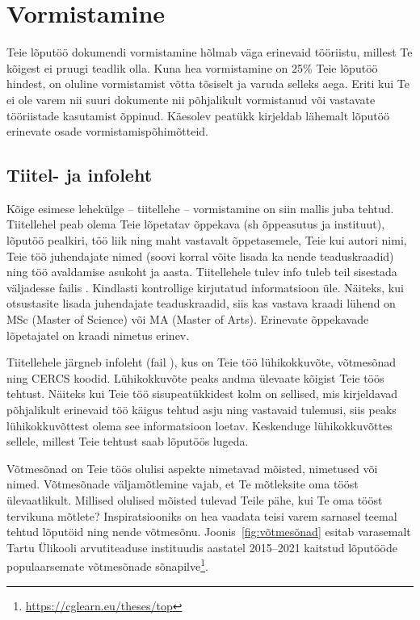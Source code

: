 \section{Vormistamine}\label{vormistamine}
Teie lõputöö dokumendi vormistamine hõlmab väga erinevaid tööriistu, millest Te kõigest ei pruugi teadlik olla. Kuna hea vormistamine on 25\% Teie lõputöö hindest, on oluline vormistamist võtta tõsiselt ja varuda selleks aega. Eriti kui Te ei ole varem nii suuri dokumente nii põhjalikult vormistanud või vastavate tööriistade kasutamist õppinud. Käesolev peatükk kirjeldab lähemalt lõputöö erinevate osade vormistamispõhimõtteid.

\subsection{Tiitel- ja infoleht}
Kõige esimese lehekülge – tiitellehe – vormistamine on siin mallis juba tehtud. Tiitellehel peab olema Teie lõpetatav õppekava (sh õppeasutus ja instituut), lõputöö pealkiri, töö liik ning maht vastavalt õppetasemele, Teie kui autori nimi, Teie töö juhendajate nimed (soovi korral võite lisada ka nende teaduskraadid) ning töö avaldamise asukoht ja aasta. Tiitellehele tulev info tuleb teil sisestada väljadesse failis . Kindlasti kontrollige kirjutatud informatsioon üle. Näiteks, kui otsustasite lisada juhendajate teaduskraadid, siis kas vastava kraadi lühend on MSc (Master of Science) või MA (Master of Arts). Erinevate õppekavade lõpetajatel on kraadi nimetus erinev.

Tiitellehele järgneb infoleht (fail ), kus on Teie töö lühikokkuvõte, võtmesõnad ning CERCS koodid. Lühikokkuvõte peaks andma ülevaate kõigist Teie töös tehtust. Näiteks kui Teie töö sisupeatükkidest kolm on sellised, mis kirjeldavad põhjalikult erinevaid töö käigus tehtud asju ning vastavaid tulemusi, siis peaks lühikokkuvõttest olema see informatsioon loetav. Keskenduge lühikokkuvõttes sellele, millest Teie tehtust saab lõputöös lugeda.

Võtmesõnad on Teie töös olulisi aspekte nimetavad mõisted, nimetused või nimed. Võtmesõnade väljamõtlemine vajab, et Te mõtleksite oma tööst ülevaatlikult. Millised olulised mõisted tulevad Teile pähe, kui Te oma tööst tervikuna mõtlete? Inspiratsiooniks on hea vaadata teisi varem sarnasel teemal tehtud lõputöid ning nende võtmesõnu. Joonis~\ref{fig:võtmesõnad} esitab varasemalt Tartu Ülikooli arvutiteaduse instituudis aastatel 2015–2021 kaitstud lõputööde populaarsemate võtmesõnade sõnapilve\footnote{\url{https://cglearn.eu/theses/top}}.

